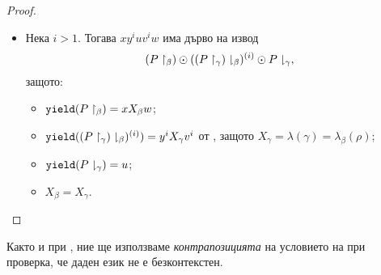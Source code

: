 \begin{proof}
\begin{enumerate}[1)]
\begin{itemize}
\begin{figure}[H]
\begin{subfigure}[t]{0.3\textwidth}
          \caption{\scriptsize{$(\uppercut{P}{\beta}) \odot (\lowercut{(\uppercut{P}{\gamma})}{\beta})^{(2)} \odot (\lowercut{P}{\gamma})$ е дърво на извод за
              думата $xy^2uv^2w$}}
        \end{subfigure}
        \end{figure}
    \item
      Нека $i > 1$. Тогава $xy^iuv^iw$ има дърво на извод
      \[({P}\upharpoonright_{\beta}) \odot ( {({P}\upharpoonright_{\gamma})}\downharpoonright_{\beta})^{(i)} \odot {P}\downharpoonright_{\gamma},\]
      защото:
      \begin{itemize}
      \item
        $\texttt{yield}({P}\upharpoonright_{\beta}) = x X_\beta w$;
      \item
        $\texttt{yield}({({P}\upharpoonright_{\gamma})}\downharpoonright_{\beta})^{(i)}) = y^i X_\gamma v^i$ от ,
        защото $X_\gamma = \lambda(\gamma) = \lambda_\beta(\rho)$;
      \item
        $\texttt{yield}({P}\downharpoonright_{\gamma}) = u$;
      \item
        $X_\beta = X_\gamma$.
      \end{itemize}
    \end{itemize}
  \end{enumerate}
\end{proof}

Както и при , ние ще използваме \emph{контрапозицията} на условието на 
при проверка, че даден език не е безконтекстен.


